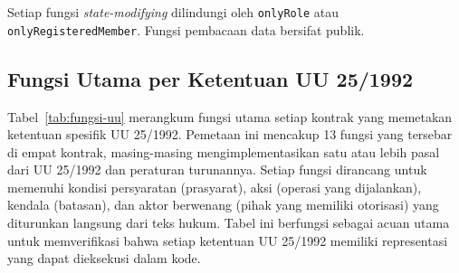 Setiap fungsi \textit{state-modifying} dilindungi oleh \texttt{onlyRole} atau \texttt{onlyRegisteredMember}. Fungsi pembacaan data bersifat publik.

\subsection{Fungsi Utama per Ketentuan UU 25/1992}

Tabel~\ref{tab:fungsi-uu} merangkum fungsi utama setiap kontrak yang memetakan ketentuan spesifik UU 25/1992. Pemetaan ini mencakup 13 fungsi yang tersebar di empat kontrak, masing-masing mengimplementasikan satu atau lebih pasal dari UU 25/1992 dan peraturan turunannya. Setiap fungsi dirancang untuk memenuhi kondisi persyaratan (prasyarat), aksi (operasi yang dijalankan), kendala (batasan), dan aktor berwenang (pihak yang memiliki otorisasi) yang diturunkan langsung dari teks hukum. Tabel ini berfungsi sebagai acuan utama untuk memverifikasi bahwa setiap ketentuan UU 25/1992 memiliki representasi yang dapat dieksekusi dalam kode.

\begin{table}[H]
\centering
\caption{Pemetaan Fungsi Smart Contract ke Ketentuan UU 25/1992}
\label{tab:fungsi-uu}
\footnotesize
{}
\end{table}

